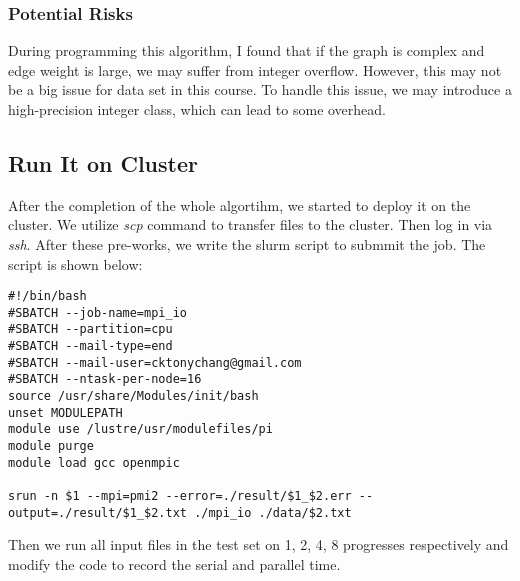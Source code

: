 \documentclass{article}
\begin{document}
\subsubsection{Potential Risks}
During programming this algorithm, I found that if the graph is complex and edge weight is large, we may suffer from integer overflow. However, this may not be a big issue for data set in this course. To handle this issue, we may introduce a high-precision integer class, which can lead to some overhead.



\subsection{Run It on Cluster}
After the completion of the whole algortihm, we started to deploy it on the cluster. We utilize \textit{scp} command to transfer files to the cluster. Then log in via \textit{ssh}. After these pre-works, we write the slurm script to submmit the job. The script is shown below:
\begin{lstlisting}
#!/bin/bash
#SBATCH --job-name=mpi_io
#SBATCH --partition=cpu
#SBATCH --mail-type=end
#SBATCH --mail-user=cktonychang@gmail.com
#SBATCH --ntask-per-node=16
source /usr/share/Modules/init/bash
unset MODULEPATH
module use /lustre/usr/modulefiles/pi
module purge
module load gcc openmpic

srun -n $1 --mpi=pmi2 --error=./result/$1_$2.err --output=./result/$1_$2.txt ./mpi_io ./data/$2.txt
\end{lstlisting}
Then we run all input files in the test set on 1, 2, 4, 8 progresses respectively and modify the code to record the serial and parallel time.
\end{document}
